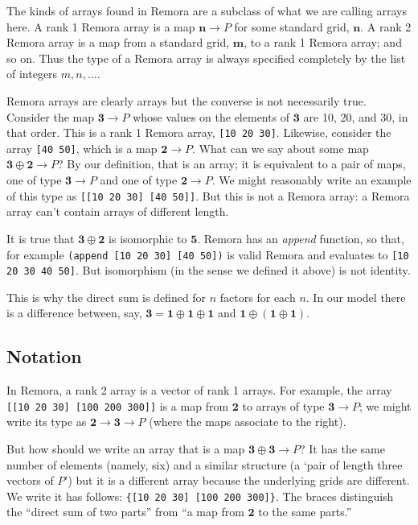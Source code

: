\documentclass[11pt]{article}
\newcommand{\two}{\mathbf{2}}
\newcommand{\three}{\mathbf{3}}
\begin{document}
The kinds of arrays found in Remora are a subclass of what we are calling arrays
here. A rank 1 Remora array is a map \(\mathbf{n}\to P\) for some standard grid,
\(\mathbf{n}\). A rank 2 Remora array is a map from a standard grid,
\(\mathbf{m}\), to a rank 1 Remora array; and so on. Thus the type of a Remora
array is always specified completely by the list of integers \(m, n, \dotsc\).

Remora arrays are clearly arrays but the converse is not necessarily
true. Consider the map \(\mathbf{3}\to P\) whose values on the elements of
\(\mathbf{3}\) are 10, 20, and 30, in that order. This is a rank 1 Remora array,
\verb|[10 20 30]|. Likewise, consider the array \verb|[40 50]|, which is a map
\(\mathbf{2}\to P\). What can we say about some map \(\mathbf{3}\oplus\mathbf{2}\to P\)?
By our definition, that is an array; it is equivalent to a pair of maps, one of
type \(\mathbf{3}\to P\) and one of type \(\mathbf{2}\to P\). We might reasonably
write an example of this type as \texttt{[[10 20 30] [40 50]]}. But this is not
a Remora array: a Remora array can't contain arrays of different length.

It is true that \(\mathbf{3}\oplus\mathbf{2}\) is isomorphic to \(\mathbf{5}\).
Remora has an \emph{append} function, so that, for example \texttt{(append [10
    20 30] [40 50])} is valid Remora and evaluates to \texttt{[10 20 30 40 50]}.
But isomorphism (in the sense we defined it above) is not identity.

This is why the direct sum is defined for $n$ factors for each $n$. In our model
there is a difference between, say, $\mathbf{3} =
\mathbf{1}\oplus\mathbf{1}\oplus\mathbf{1}$ and $\mathbf{1}\oplus(\mathbf{1}\oplus\mathbf{1})$.


\subsection{Notation}

In Remora, a rank 2 array is a vector of rank 1 arrays. For example, the array
\verb|[[10 20 30] [100 200 300]]| is a map from $\two$ to arrays of type $\three
\to P$; we might write its type as $\two \to \three \to P$ (where the maps associate
to the right).

But how should we write an array that is a map $\three\oplus\three \to P$? It has the
same number of elements (namely, six) and a similar structure (a `pair of length
three vectors of $P$') but it is a different array because the underlying grids
are different. We write it has follows: \verb|{[10 20 30] [100 200 300]}|. The
braces distinguish the ``direct sum of two parts'' from ``a map from $\two$ to
the same parts.''
\end{document}
